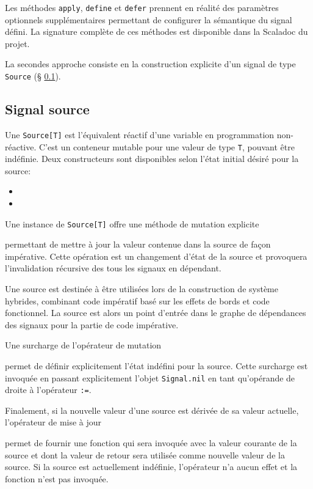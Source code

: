 Les méthodes \texttt{apply}, \texttt{define} et \texttt{defer} prennent en réalité des paramètres optionnels supplémentaires permettant de configurer la sémantique du signal défini. La signature complète de ces méthodes est disponible dans la Scaladoc du projet.

La secondes approche consiste en la construction explicite d'un signal de type \texttt{Source} (§ \ref{sec:sig-source}). 

\subsection{Signal source} \label{sec:sig-source}

Une \texttt{Source[T]} est l'équivalent réactif d'une variable en programmation non-réactive. C'est un conteneur mutable pour une valeur de type \texttt{T}, pouvant être indéfinie. Deux constructeurs sont disponibles selon l'état initial désiré pour la source:

\begin{itemize}
	\item {}
	\item {}
\end{itemize}

Une instance de \texttt{Source[T]} offre une méthode de mutation explicite
\begin{center}
\end{center}
permettant de mettre à jour la valeur contenue dans la source de façon impérative. Cette opération est un changement d'état de la source et provoquera l'invalidation récursive des tous les signaux en dépendant.

Une source est destinée à être utilisées lors de la construction de système hybrides, combinant code impératif basé sur les effets de bords et code fonctionnel. La source est alors un point d'entrée dans le graphe de dépendances des signaux pour la partie de code impérative.

Une surcharge de l'opérateur de mutation
\begin{center}
\end{center}
permet de définir explicitement l'état indéfini pour la source. Cette surcharge est invoquée en passant explicitement l'objet \texttt{Signal.nil} en tant qu'opérande de droite à l'opérateur \texttt{:=}.

Finalement, si la nouvelle valeur d'une source est dérivée de sa valeur actuelle, l'opérateur de mise à jour
\begin{center}
\end{center}
permet de fournir une fonction qui sera invoquée avec la valeur courante de la source et dont la valeur de retour sera utilisée comme nouvelle valeur de la source. Si la source est actuellement indéfinie, l'opérateur n'a aucun effet et la fonction n'est pas invoquée.

